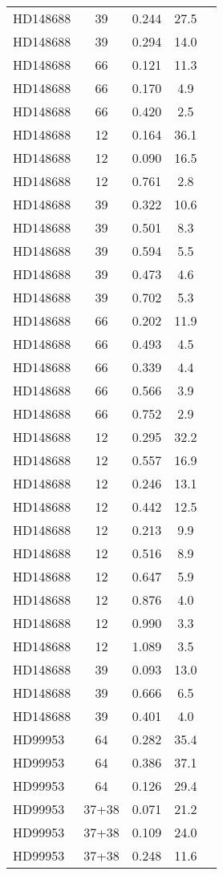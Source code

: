 \begin{table*}
\begin{tabular}{l c c c c}
HD148688 & 39 & 0.244 & 27.5\\ 
HD148688 & 39 & 0.294 & 14.0\\ 
HD148688 & 66 & 0.121 & 11.3\\ 
HD148688 & 66 & 0.170 & 4.9\\ 
HD148688 & 66 & 0.420 & 2.5\\ 
HD148688 & 12 & 0.164 & 36.1\\ 
HD148688 & 12 & 0.090 & 16.5\\ 
HD148688 & 12 & 0.761 & 2.8\\ 
HD148688 & 39 & 0.322 & 10.6\\ 
HD148688 & 39 & 0.501 & 8.3\\ 
HD148688 & 39 & 0.594 & 5.5\\ 
HD148688 & 39 & 0.473 & 4.6\\ 
HD148688 & 39 & 0.702 & 5.3\\ 
HD148688 & 66 & 0.202 & 11.9\\ 
HD148688 & 66 & 0.493 & 4.5\\ 
HD148688 & 66 & 0.339 & 4.4\\ 
HD148688 & 66 & 0.566 & 3.9\\ 
HD148688 & 66 & 0.752 & 2.9\\ 
HD148688 & 12 & 0.295 & 32.2\\ 
HD148688 & 12 & 0.557 & 16.9\\ 
HD148688 & 12 & 0.246 & 13.1\\ 
HD148688 & 12 & 0.442 & 12.5\\ 
HD148688 & 12 & 0.213 & 9.9\\ 
HD148688 & 12 & 0.516 & 8.9\\ 
HD148688 & 12 & 0.647 & 5.9\\ 
HD148688 & 12 & 0.876 & 4.0\\ 
HD148688 & 12 & 0.990 & 3.3\\ 
HD148688 & 12 & 1.089 & 3.5\\ 
HD148688 & 39 & 0.093 & 13.0\\ 
HD148688 & 39 & 0.666 & 6.5\\ 
HD148688 & 39 & 0.401 & 4.0\\ 
\hline
HD99953 & 64 & 0.282 & 35.4\\ 
HD99953 & 64 & 0.386 & 37.1\\ 
HD99953 & 64 & 0.126 & 29.4\\ 
HD99953 & 37+38 & 0.071 & 21.2\\ 
HD99953 & 37+38 & 0.109 & 24.0\\ 
HD99953 & 37+38 & 0.248 & 11.6\\ 

\end{tabular}
\end{table*}
